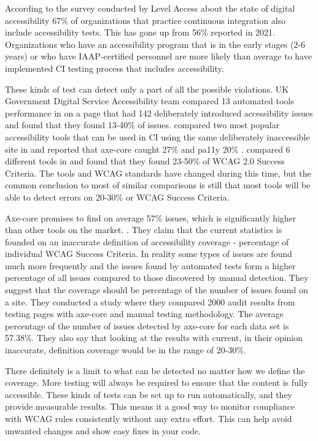 \documentclass{master_thesis}
\begin{document}
According to the survey conducted by Level Access about the state of digital accessibility 67\% of organizations that practice continuous integration also include accessibility tests. This has gone up from 56\% reported in 2021. Organizations who have an accessibility program that is in the early stages (2-6 years) or who have IAAP-certified personnel are more likely than average to have implemented CI testing process that includes accessibility. \citep{LevelAccess}

These kinds of test can detect only a part of all the possible violations. UK Government Digital Service Accessibility team compared 13 automated tools performance in \citeyear{GAT2018} on a page that had 142 deliberately introduced accessibility issues and found that they found 13-40\% of issues. \citeauthor{Abbott2021} compared two most popular accessibility tools that can be used in CI using the same deliberately inaccessible site in \citeyear{Abbott2021} and reported that axe-core caught 27\% and pa11y 20\% \citep{Abbott2021}. \citeauthor{Vigo2013} compared 6 different tools in \citeyear{Vigo2013} and found that they found 23-50\% of  WCAG 2.0 Success Criteria. \citep{GAT2018,Abbott2021,Vigo2013} The tools and WCAG standards have changed during this time, but the common conclusion to most of similar comparisons is still that most tools will be able to detect errors on 20-30\% or WCAG Success Criteria. 

Axe-core promises to find on average 57\% issues, which is significantly higher than other tools on the market.  \citep{Deque2023}. They claim that the current statistics is founded on an inaccurate definition of accessibility coverage - percentage of individual WCAG Success Criteria. In reality some types of issues are found much more frequently and the issues found by automated tests form a higher percentage of all issues compared to those discovered by manual detection. They suggest that the coverage should be percentage of the number of issues found on a site.  They conducted a study where they compared 2000 audit results from testing pages with axe-core and manual testing methodology. The average percentage of the number of issues detected by axe-core for each data set is 57.38\%. They also say that looking at the results with current, in their opinion inaccurate, definition coverage would be in the range of 20-30\%. \citep{DequeSystems2021report}

There definitely is a limit to what can be detected no matter how we define the coverage. More testing will always be required to ensure that the content is fully accessible. These kinds of tests can be set up to run automatically, and they provide measurable results. This means it a good way to monitor compliance with WCAG rules consistently without any extra effort. This can help avoid unwanted changes and show easy fixes in  your code.

\end{document}
